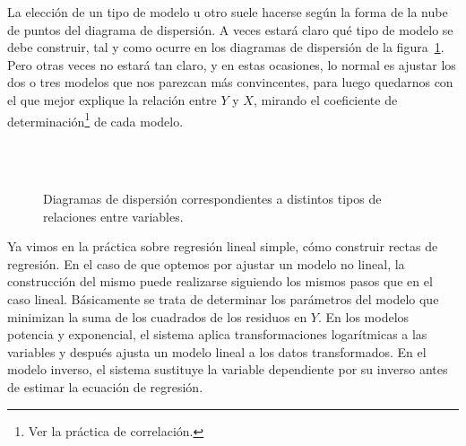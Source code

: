 La elección de un tipo de modelo u otro suele hacerse según la forma
de la nube de puntos del diagrama de dispersión. A veces estará
claro qué tipo de modelo se debe construir, tal y como ocurre en los
diagramas de dispersión de la figura~\ref{g:tiposrelaciones2}. Pero
otras veces no estará tan claro, y en estas ocasiones, lo normal es
ajustar los dos o tres modelos que nos parezcan más convincentes,
para luego quedarnos con el que mejor explique la relación entre $Y$
y $X$, mirando el coeficiente de determinación\footnote{Ver la
práctica de correlación.} de cada modelo.

\begin{figure}[h!]
\centering 
{}\qquad
{}\qquad
{}\\
\qquad
{}\qquad
{}\\
\caption{Diagramas de dispersión correspondientes a distintos tipos de relaciones
entre variables.} \label{g:tiposrelaciones2}
\end{figure}

Ya vimos en la práctica sobre regresión lineal simple, cómo
construir rectas de regresión. En el caso de que optemos por ajustar
un modelo no lineal, la construcción del mismo puede realizarse
siguiendo los mismos pasos que en el caso lineal. Básicamente se
trata de determinar los parámetros del modelo que minimizan la suma
de los cuadrados de los residuos en $Y$. En los modelos
potencia y exponencial, el sistema aplica transformaciones
logarítmicas a las variables y después ajusta un modelo lineal a los
datos transformados. En el modelo inverso, el sistema sustituye la
variable dependiente por su inverso antes de estimar la ecuación
de regresión.

\clearpage
\newpage


